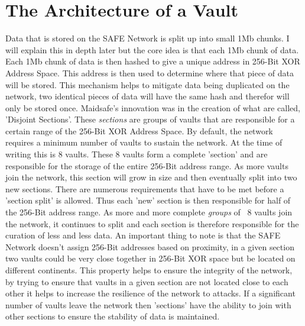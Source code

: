 \documentclass{l4proj}
\begin{document}
\section{The Architecture of a Vault}

Data that is stored on the SAFE Network is split up into small 1Mb chunks. I will explain this in depth later but the core idea is that each 1Mb chunk of data. Each 1Mb chunk of data is then hashed to give a unique address in 256-Bit XOR Address Space. This address is then used to determine where that piece of data will be stored. This mechanism helps to mitigate data being duplicated on the network, two identical pieces of data will have the same hash and therefor will only be stored once. Maidsafe's innovation was in the creation of what are called, 'Disjoint Sections'. These \textit{sections} are groups of vaults that are responsible for a certain range of the 256-Bit XOR Address Space. By default, the network requires a minimum number of vaults to sustain the network. At the time of writing this is 8 vaults. These 8 vaults form a complete 'section' and are responsible for the storage of the entire 256-Bit address range. As more vaults join the network, this section will grow in size and then eventually split into two new sections. There are numerous requirements that have to be met before a 'section split' is allowed. Thus each 'new' section is then responsible for half of the 256-Bit address range. As more and more complete \textit{groups} of ~8 vaults join the network, it continues to split and each section is therefore responsible for the curation of less and less data. An important thing to note is that the SAFE Network doesn't assign 256-Bit addresses based on proximity, in a given section two vaults could be very close together in 256-Bit XOR space but be located on different continents. This property helps to ensure the integrity of the network, by trying to ensure that vaults in a given section are not located close to each other it helps to increase the resilience of the network to attacks. If a significant number of vaults leave the network then 'sections' have the ability to join with other sections to ensure the stability of data is maintained.
\end{document}
